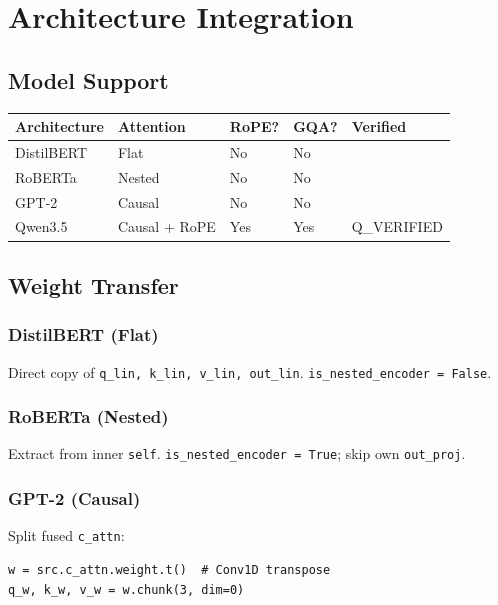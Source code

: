 
\section{Architecture Integration}

\subsection{Model Support}

\begin{table}[H]
\centering
\small
\begin{tabular}{lllll}
\toprule
\textbf{Architecture} & \textbf{Attention} & \textbf{RoPE?} & \textbf{GQA?} & \textbf{Verified} \\
\midrule
DistilBERT & Flat & No & No &  \\
RoBERTa & Nested & No & No &  \\
GPT-2 & Causal & No & No &  \\
Qwen3.5 & Causal + RoPE & Yes & Yes & {{Q\_VERIFIED}} \\
\bottomrule
\end{tabular}
\end{table}

\subsection{Weight Transfer}

\subsubsection{DistilBERT (Flat)}

Direct copy of \texttt{q\_lin, k\_lin, v\_lin, out\_lin}. \texttt{is\_nested\_encoder = False}.

\subsubsection{RoBERTa (Nested)}

Extract from inner \texttt{self}. \texttt{is\_nested\_encoder = True}; skip own \texttt{out\_proj}.

\subsubsection{GPT-2 (Causal)}

Split fused \texttt{c\_attn}:

\begin{lstlisting}
w = src.c_attn.weight.t()  # Conv1D transpose
q_w, k_w, v_w = w.chunk(3, dim=0)
\end{lstlisting}

